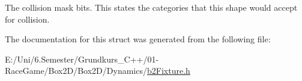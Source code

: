 The collision mask bits. This states the categories that this shape would accept for collision. 

The documentation for this struct was generated from the following file\+:\begin{DoxyCompactItemize}
\item 
E\+:/\+Uni/6.\+Semester/\+Grundkurs\+\_\+\+C++/01-\/\+Race\+Game/\+Box2\+D/\+Box2\+D/\+Dynamics/\mbox{\hyperlink{b2_fixture_8h}{b2\+Fixture.\+h}}\end{DoxyCompactItemize}
